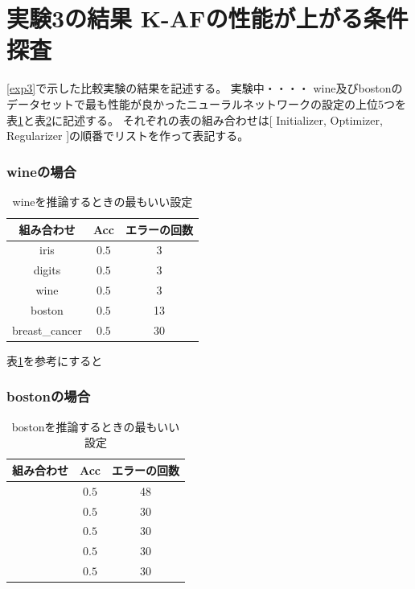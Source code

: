 \section{実験3の結果 K-AFの性能が上がる条件探査}
\label{evo3}
\ref{exp3}で示した比較実験の結果を記述する。
実験中・・・・
wine及びbostonのデータセットで最も性能が良かったニューラルネットワークの設定の上位5つを表\ref{winebest}と表\ref{bostonbest}に記述する。
それぞれの表の組み合わせは[ Initializer, Optimizer, Regularizer ]の順番でリストを作って表記する。
\subsubsection{wineの場合}

\begin{table}[htbp]
    \begin{center}
        \caption{wineを推論するときの最もいい設定}
        \label{winebest}
        \vspace{2mm} 
        \begin{tabular}{ |c|c|c| }
        組み合わせ & Acc & エラーの回数 \\
        \hline
        iris           & $ 0.5 $    & 3 \\
        digits         & $ 0.5 $    & 3 \\
        wine           & $ 0.5 $    & 3 \\
        boston         & $ 0.5 $    & 13  \\
        breast\_cancer & $ 0.5 $    & 30 \\
        \end{tabular}
    \end{center}
\end{table}

表\ref{winebest}を参考にすると

\subsubsection{bostonの場合}

\begin{table}[htbp]
    \begin{center}
        \caption{bostonを推論するときの最もいい設定}
        \label{bostonbest}
        \vspace{2mm} 
        \begin{tabular}{ |c|c|c| }
        組み合わせ & Acc & エラーの回数 \\
        \hline
        [Adam....    ]       & $ 0.5 $    & 48 \\
        [Adam....    ]          & $ 0.5 $    & 30 \\
        [Adam....    ]            & $ 0.5 $    & 30 \\
        [Adam....    ]          & $ 0.5 $    & 30  \\
        [Adam....    ]       & $ 0.5 $    & 30 \\
        \end{tabular}
    \end{center}
\end{table}




